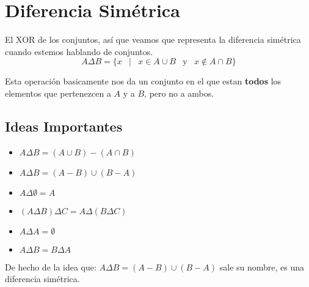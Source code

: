 \documentclass[12pt, fleqn]{report}                             %
\DeclareMathOperator \Space {\quad}                             %
\DeclareMathOperator \MiniSpace {\;}                            %
\newcommand \Such {\MiniSpace|\MiniSpace}                       %
\newcommand \Also {\MiniSpace \text{y} \MiniSpace}              %
\begin{document}
        \clearpage
        \section{Diferencia Simétrica}

            El XOR de los conjuntos, así que veamos que representa la diferencia simétrica cuando estemos
            hablando de conjuntos.
            \begin{equation*}
                A \Delta B = \{ x \Such x \in A \cup B \Also  x \notin A \cap B \}
            \end{equation*}

            Esta operación basicamente nos da un conjunto en el que estan \textbf{todos} los elementos
            que pertenezcen a $A$ y a $B$, pero no a ambos.

            \subsection{Ideas Importantes}

                \begin{itemize}
                    \item $A \Delta B = (A \cup B) - ( A \cap B)$

                    \item $A \Delta B = (A - B) \cup ( B - A)$

                    \item $A \Delta \emptyset = A$

                    \item $(A \Delta B) \Delta C = A \Delta (B \Delta C)$

                    \item $A \Delta A = \emptyset$

                    \item $A \Delta B = B \Delta A$

                \end{itemize}

            De hecho de la idea que: $A \Delta B = (A - B) \cup ( B - A)$ sale su nombre, es una diferencia simétrica.
\end{document}
